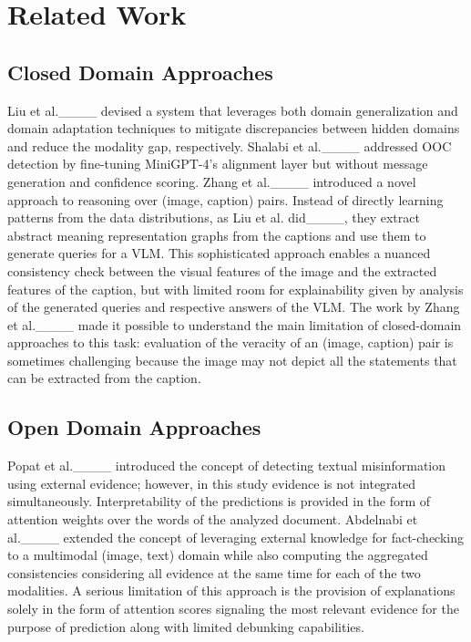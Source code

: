 \section{Related Work}
\subsection{Closed Domain Approaches}
Liu et al.____ devised a system that leverages both domain generalization and domain adaptation techniques to mitigate discrepancies between hidden domains and reduce the modality gap, respectively.
Shalabi et al.____ addressed OOC detection by fine-tuning MiniGPT-4's alignment layer but without message generation and confidence scoring. Zhang et al.____ introduced a novel approach to reasoning over (image, caption) pairs. Instead of directly learning patterns from the data distributions, as Liu et al. did____, they extract abstract meaning representation graphs from the captions and use them to generate queries for a VLM. This sophisticated approach enables a nuanced consistency check between the visual features of the image and the extracted features of the caption, but with limited room for explainability given by analysis of the generated queries and respective answers of the VLM. The work by Zhang et al.____ made it possible to understand the main limitation of closed-domain approaches to this task: evaluation of the veracity of an (image, caption) pair is sometimes challenging because the image may not depict all the statements that can be extracted from the caption. 

\subsection{Open Domain Approaches}
Popat et al.____ introduced the concept of detecting textual misinformation using external evidence; however,
in this study evidence is not integrated simultaneously.
Interpretability of the predictions is provided in the form of attention weights over the words of the analyzed document. Abdelnabi et al.____ extended the concept of leveraging external knowledge for fact-checking to a multimodal (image, text) domain while also computing the aggregated consistencies considering all evidence at the same time for each of the two modalities.
A serious limitation of this approach is the provision of explanations solely in the form of attention scores signaling the most relevant evidence for the purpose of prediction along with limited debunking capabilities. 

